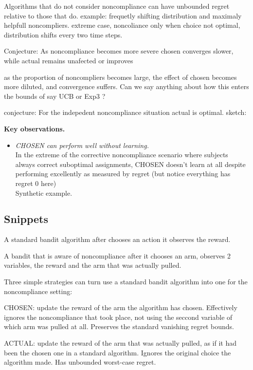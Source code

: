 Algorithms that do not consider noncompliance can have unbounded regret relative to those that do.
example: frequetly shifting distribution and maximaly helpfull noncompliers. extreme case, noncoliance only when choice not optimal, distribution shifts every two time steps.

Conjecture: As noncompliance becomes more severe chosen converges slower, while actual remains unafected or improves

as the proportion of noncompliers becomes large, the effect of chosen becomes more diluted, and convergence suffers. Can we say anything about how this enters the bounds of say UCB or Exp3 ? 

conjecture: For the indepedent noncompliance situation actual is optimal.
sketch: 

\textbf{Key observations.}
	\begin{itemize}
		\item \emph{CHOSEN can perform well without learning.}\\
		In the extreme of the corrective noncompliance scenario where subjects always correct suboptimal assignments, CHOSEN doesn't learn at all despite performing excellently as measured by regret (but notice everything has regret 0 here) \\
		Synthetic example.
	\end{itemize}	


\subsection{Snippets}


A standard bandit algorithm after chooses an action it observes the reward.

A bandit that is aware of noncompliance after it chooses an arm, observes 2 variables, the reward and the arm that was actually pulled.

Three simple strategies can turn use a standard bandit algorithm into one for the noncompliance setting:

CHOSEN: update the reward of the arm the algorithm has chosen. Effectively ignores the noncompliance that took place, not using the seccond variable of which arm was pulled at all. Preserves the standard vanishing regret bounds.

ACTUAL: update the reward of the arm that was actually pulled, as if it had been the chosen one  in a standard algorithm. Ignores the original choice the algorithm made. Has unbounded worst-case regret.

